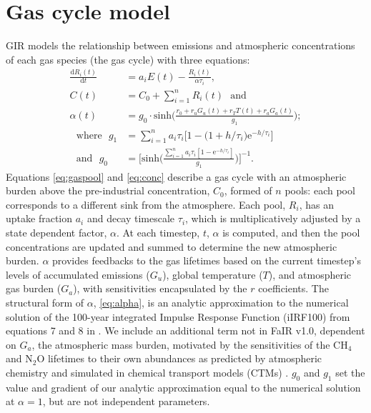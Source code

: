 \documentclass[gmd, manuscript]{copernicus}
\begin{document}
\section{Gas cycle model}
GIR models the relationship between emissions and atmospheric concentrations of each gas species (the gas cycle) with three equations:
\begin{align}
    \frac{\text{d}R_{i}(t)}{\text{d}t} &= a_{i}E(t) - \frac{R_{i}(t)}{\alpha \tau_{i}}, \label{eq:gaspool}\\
    C(t) &= C_0 + \sum_{i=1}^{n}{R_{i}(t)} \text{~~and~~} \label{eq:conc}\\
    \alpha(t) &= g_0 \cdot \text{sinh}\Big(\frac{r_0 + r_uG_{u}(t) + r_TT(t) + r_aG_a(t)}{g_1}\Big); \label{eq:alpha}\\
    \text{~~where~~}g_1 &= \sum_{i=1}^{n}{a_i\tau_i\big[1 - \big(1 + h/\tau_i\big)\text{e}^{-h/\tau_i}\big]} \nonumber\\
    \text{~~and~~}g_0 &= \Big[ \text{sinh} \Big( \frac{ \sum_{i=1}^{n}{a_i \tau_i [1 - \text{e}^{-h/ \tau_i}]}}{g_1} \Big) \Big] ^{-1}. \nonumber
\end{align}
Equations \ref{eq:gaspool} and \ref{eq:conc} describe a gas cycle with an atmospheric burden above the pre-industrial concentration, $C_0$, formed of $n$ pools: each pool corresponds to a different sink from the atmosphere. Each pool, $R_i$, has an uptake fraction $a_i$ and decay timescale $\tau_i$, which is multiplicatively adjusted by a state dependent factor, $\alpha$. At each timestep, $t$, $\alpha$ is computed, and then the pool concentrations are updated and summed to determine the new atmospheric burden. $\alpha$ provides feedbacks to the gas lifetimes based on the current timestep’s levels of accumulated emissions ($G_u$), global temperature ($T$), and atmospheric gas burden ($G_a$), with sensitivities encapsulated by the $r$ coefficients. The structural form of $\alpha$, \eqref{eq:alpha}, is an analytic approximation to the numerical solution of the 100-year integrated Impulse Response Function (iIRF100) from equations 7 and 8 in \cite{Millar2016}. We include an additional term not in FaIR v1.0, dependent on $G_a$, the atmospheric mass burden, motivated by the sensitivities of the CH$_4$ and N$_2$O lifetimes to their own abundances as predicted by atmospheric chemistry and simulated in chemical transport models (CTMs) \citep{Holmes2013,Prather2015}. $g_0$ and $g_1$ set the value and gradient of our analytic approximation equal to the numerical solution at $\alpha = 1$, but are not independent parameters. \\\\
\end{document}
